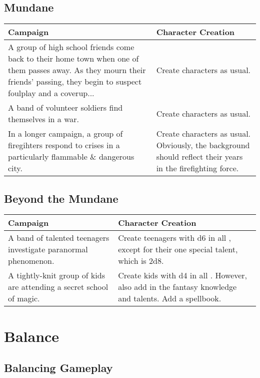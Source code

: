 \documentclass{LegrandOrangeTufteBook}
\begin{document}
\subsection*{Mundane}
\begin{center}
	\begin{xltabular}{\textwidth}{XX}
		Campaign & Character Creation \\
		\hline
{}    A group of high school friends come back to their home town when one of them passes away. As they mourn their friends' passing, they begin to suspect foulplay and a coverup... & Create characters as usual. \\
				A band of volunteer soldiers find themselves in a war. & Create characters as usual. \\
    In a longer campaign, a group of firegihters respond to crises in a particularly flammable \& dangerous city. & Create characters as usual. Obviously, the background should reflect their years in the firefighting force. \\
	\end{xltabular}
\end{center}


\subsection*{Beyond the Mundane}
\begin{center}
	\begin{xltabular}{\textwidth}{XX}
		Campaign & Character Creation \\
		\hline
{}    A band of talented teenagers investigate paranormal phenomenon. & Create teenagers with d6 in all , except for their one special talent, which is 2d8.\\
   				A tightly-knit group of kids are attending a secret school of magic. & Create kids with d4 in all . However, also add in the fantasy knowledge and talents. Add a spellbook. \\

	\end{xltabular}
\end{center}

\section*{Balance}

\subsection*{Balancing Gameplay}
\end{document}

